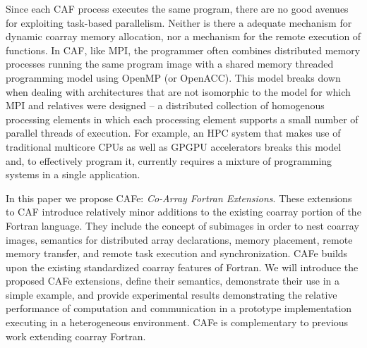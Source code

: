 Since each CAF process executes the same program, there are no good avenues for exploiting
task-based parallelism.  Neither is there a adequate mechanism for dynamic coarray memory
allocation, nor a mechanism for the remote execution of functions.  In CAF, like MPI, the
programmer often combines distributed memory processes running the same program image with a
shared memory threaded programming model using OpenMP (or OpenACC).  This model breaks down
when dealing with architectures that are not isomorphic to the model for which MPI and
relatives were designed -- a distributed collection of homogenous processing elements in
which each processing element supports a small number of parallel threads of execution.  For
example, an HPC system that makes use of traditional multicore CPUs as well as GPGPU accelerators
breaks this model and, to effectively program it, currently requires a mixture of programming
systems in a single application.

In this paper we propose CAFe: \emph{Co-Array Fortran Extensions}.  These extensions to CAF introduce
relatively minor additions to the existing coarray portion of the Fortran language.  They
include the concept of subimages in order to nest coarray images, semantics for distributed
array declarations, memory placement, remote memory transfer, and remote task execution
and synchronization.  CAFe
builds upon the existing standardized coarray features of Fortran.  We will introduce the
proposed CAFe extensions, define their semantics, demonstrate their use in a simple
example, and provide experimental results demonstrating the relative
performance of computation and communication in a prototype implementation executing
in a heterogeneous environment.
CAFe is complementary to
previous work extending coarray Fortran\cite{mellor-crummey:2009:caf2,jin:2011:caf2}.



